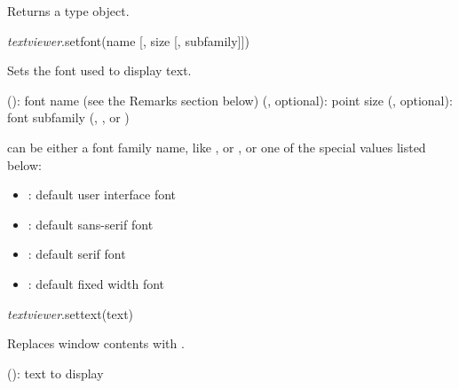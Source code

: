 \documentclass[a4paper,12pt,twoside,extrafontsizes]{memoir}
\begin{document}
\begin{funcret}
	Returns a  type object.
\end{funcret}


\begin{luafuncprototype}
\emph{textviewer}.setfont(name [, size [, subfamily]])
\end{luafuncprototype}

\begin{funcdescr}
	Sets the font used to display text.
\end{funcdescr}

\begin{funcparams}
	 (): font name (see the Remarks section below)
	 (, optional): point size
	 (, optional): font subfamily (, ,  or )
\end{funcparams}

\begin{funcremarks}
	 can be either a font family name, like ,  or , or one of the special values listed below:
	
	\begin{itemize}
		\item {}: default user interface font
		\item {}: default sans-serif font
		\item {}: default serif font
		\item {}: default fixed width font
	\end{itemize}
\end{funcremarks}


\begin{luafuncprototype}
\emph{textviewer}.settext(text)
\end{luafuncprototype}

\begin{funcdescr}
	Replaces window contents with .
\end{funcdescr}

\begin{funcparams}
	 (): text to display
\end{funcparams}
\end{document}
